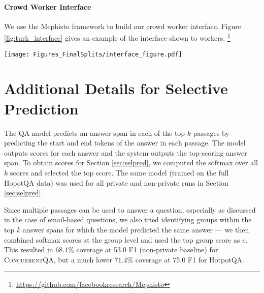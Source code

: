 \documentclass{article}
\newcommand{\datasetname}{\textsc{ConcurrentQA}\xspace}
\begin{document}
\paragraph{Crowd Worker Interface} 
We use the Mephisto framework to build our crowd worker interface. Figure \ref{fig:turk_interface} gives an example of the interface shown to workers. \footnote{\url{https://github.com/facebookresearch/Mephisto}}

\begin{figure*}[t!]
    \centering
    \texttt{[image: Figures\_FinalSplits/interface\_figure.pdf]}
    \caption[width=\linewidth]{Mechanical Turk interface for \datasetname data collection. Crowdworkers select checkboxes for supporting passages, highlight the answer span, and write the question in the text box.}
    \label{fig:turk_interface}
\end{figure*}


 \section{Additional Details for Selective Prediction}

The QA model predicts an answer span in each of the top $k$ passages by predicting the start and end tokens of the answer in each passage. The model outputs scores for each answer and the system outputs the top-scoring answer span. To obtain scores for Section \ref{sec:selpred}, we computed the softmax over all $k$ scores and selected the top score. The same model (trained on the full HopotQA data) was used for all private and non-private runs in Section \ref{sec:selpred}.

Since multiple passages can be used to answer a question, especially as discussed in the case of email-based questions, we also tried identifying groups within the top $k$ answer spans for which the model predicted the same answer --- we then combined softmax scores at the group level and used the top group score as $c$. This resulted in $68.1\%$ coverage at 53.0 F1 (non-private baseline) for \datasetname, but a much lower $71.4\%$ coverage at 75.0 F1 for HotpotQA.

 
\end{document}
